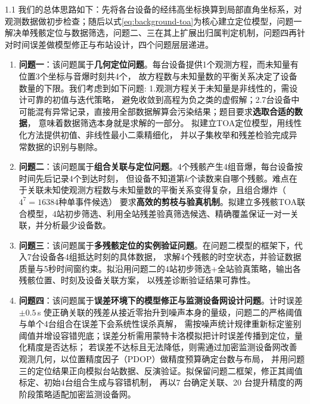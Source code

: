 \documentclass[draft,12pt,a4paper]{ctexart}
\theoremstyle{definition}
\begin{document}
\begin{spacing}{1.1}
我们的总体思路如下：先将各台设备的经纬高坐标换算到局部直角坐标系，对观测数据做初步检查；随后以式\eqref{eq:background-toa}为核心建立定位模型，问题一解决单残骸定位与数据筛选，问题二、三在其上扩展出归属判定机制，问题四再针对时间误差做模型修正与布站设计，四个问题层层递进。

\begin{enumerate}[label=\arabic*.]
  \item \textbf{问题一}：该问题属于\textbf{几何定位问题}。每台设备提供1个观测方程，而未知量有位置3个坐标与音爆时刻共4个，
  故方程数与未知量数的平衡关系决定了设备数量的下限。我们考虑到如下问题: 1.观测方程关于未知量是非线性的，需设计可靠的初值与迭代策略，
  避免收敛到高程为负之类的虚假解；2.7台设备中可能混有异常记录，直接用全部数据解算会污染结果；题目要求\textbf{选取合适的数据}，
  意味着数据筛选本身就是求解的一部分。
  拟建立TOA定位模型，用线性化方法提供初值、非线性最小二乘精细化，
  并以子集枚举和残差检验完成异常数据的识别与剔除。
  \item \textbf{问题二}：该问题属于\textbf{组合关联与定位问题}。4个残骸产生4组音爆，每台设备按时间先后记录4个到达时刻，
  但设备不知道第$k$个读数来自哪个残骸。难点在于关联未知使观测方程数与未知量数的平衡关系变得复杂，且组合爆炸（$4^7=16384$种单事件候选）
  要求\textbf{高效的剪枝与验真机制}。拟建立多残骸TOA联合模型，4站初步筛选、利用全站残差验真筛选候选、精确覆盖保证一对一关联，并分析最少设备数。
  \item \textbf{问题三}：该问题属于\textbf{多残骸定位的实例验证问题}。在问题二模型的框架下，代入7台设备各4组抵达时刻的具体数据，
  求解4个残骸的时空状态，并验证数据质量与5秒时间窗约束。拟沿用问题二的4站初步筛选+全站验真策略，输出各残骸位置、时刻及设备关联方案，
  以残差诊断验证结果可靠性。
  \item \textbf{问题四}：该问题属于\textbf{误差环境下的模型修正与监测设备网设计问题}。计时误差$\pm0.5$\,s
  使正确关联的残差从接近零抬升到噪声本身的量级，问题二的严格阈值与单个4台组合在误差下会系统性误杀真解，
  需按噪声统计规律重新标定鉴别阈值并增设容错兜底；误差分析需用蒙特卡洛模拟把计时误差传播到定位，量化精度是否达标；
  若误差不达标且无法降低，则需通过加密监测设备网改善观测几何，以位置精度因子（PDOP）做精度预算确定台数与布局，
  并用问题三的定位结果正向模拟台站数据、反演验证。拟保留问题二框架，修正其阈值标定、初始4台组合生成与容错机制，
  再以7 台确定关联、20 台提升精度的两阶段策略适配加密监测设备网。
\end{enumerate}

\end{spacing}
\end{document}
